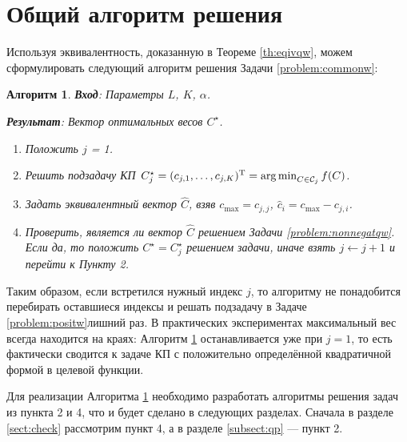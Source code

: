 \documentclass[10pt]{article}
\DeclareMathOperator*{\argmin}{arg\,min}
\newtheorem{algorithm}{Алгоритм}
\begin{document}
\section{Общий алгоритм решения}
Используя эквивалентность, доказанную в Теореме \ref{th:eqivqw}, можем сформулировать следующий алгоритм решения Задачи \ref{problem:commonw}:

\begin{algorithm}
	\label{alg:solveqw}
	\textbf{Вход}: Параметры $L$, $K$, $\alpha$.
	
	\textbf{Результат}:
	Вектор оптимальных весов $C^\star$.
	
	\begin{enumerate}
		\item Положить $j$ = 1.
		\item Решить подзадачу КП $C^\star_j = (c_{j, 1}, \ldots, c_{j, K})^\rmT = \argmin_{C \in \calC_j} f(C)$.
		\item Задать эквивалентный вектор $\widehat C$, взяв $c_\text{max} = c_{j, j}$, $\hat c_i = c_\text{max} - c_{j, i}$.
		\item Проверить, является ли вектор $\widehat C$ решением Задачи \ref{problem:nonnegatqw}. Если да, то положить $C^\star = C^\star_j$ решением задачи, иначе взять $j \leftarrow j + 1$ и перейти к Пункту 2.
	\end{enumerate}
\end{algorithm}

Таким образом, если встретился нужный индекс $j$, то алгоритму не понадобится перебирать оставшиеся индексы и решать подзадачу в Задаче \ref{problem:positw}лишний раз. В практических экспериментах максимальный вес всегда находится на краях: Алгоритм \ref{alg:solveqw} останавливается уже при $j = 1$, то есть фактически сводится к задаче КП с положительно определённой квадратичной формой в целевой функции.

Для реализации Алгоритма \ref{alg:solveqw} необходимо разработать алгоритмы решения задач из пункта 2 и 4, что и будет сделано в следующих разделах. Сначала в разделе \ref{sect:check} рассмотрим пункт 4, а в разделе \ref{subsect:qp} --- пункт 2.

\end{document}
